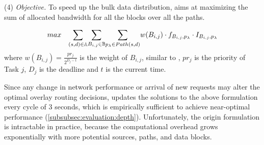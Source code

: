 
\noindent(4) {\em Objective.} To speed up the bulk data distribution, \name aims at maximizing the sum of allocated bandwidth for all the blocks over all the paths.

\begin{equation}
\centering
max \quad \displaystyle{\sum_{(s,d)\in \mathbb{A}}} \displaystyle{\sum_{B_{i,j} \in \mathbb{B}}} \displaystyle{\sum_{p_{\lambda}\in Path(s,d)}} w(B_{i,j})\cdot f_{B_{i,j},p_\lambda} \cdot I_{B_{i,j},p_\lambda}
\label{equation:objective}
\end{equation}
where $w(B_{i,j}) = \frac{pr_j}{2^{D_j-t}}$ is the weight of $B_{i,j}$, similar to \cite{zhang2015guarantee}, $pr_j$ is the priority of Task $j$, $D_j$ is the deadline and $t$ is the current time.

Since any change in network performance or arrival of
new requests may alter the optimal overlay
routing decisions,
\name updates the solutions to the above formulation every cycle of 3 seconds, which is empirically sufficient to achieve near-optimal performance (\Section\ref{subsubsec:evaluation:depth}). Unfortunately, the origin formulation is intractable in practice, because the computational overhead grows exponentially with more potential sources, paths, and data blocks.

